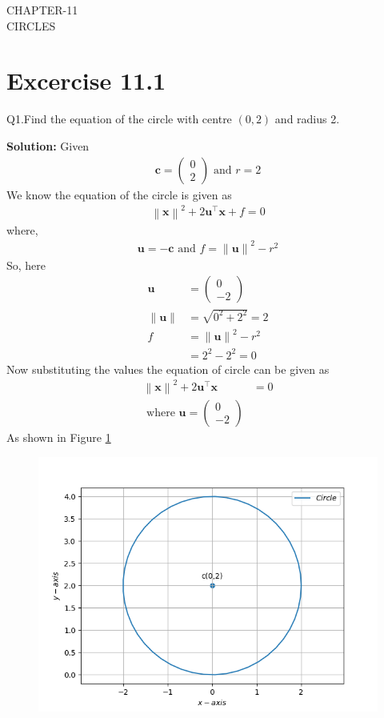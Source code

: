 \documentclass[12pt]{article}
\providecommand{\norm}[1]{\left\lVert#1\right\rVert}
\newcommand{\solution}{\noindent \textbf{Solution: }}
\newcommand{\myvec}[1]{\ensuremath{\begin{pmatrix}#1\end{pmatrix}}}
\let\vec\mathbf
\begin{document}
\begin{center}
\textbf\large{CHAPTER-11 \\ CIRCLES}

\end{center}
\section*{Excercise 11.1}

Q1.Find the equation of the circle with centre $(0,2)$ and radius 2.

\solution
Given
\begin{align}
	\vec{c} = \myvec{0\\2} \text{ and } r = 2
\end{align}
We know the equation of the circle is given as
\begin{align}
	\norm{\vec{x}}^{2} + 2\vec{u}^{\top}\vec{x} + f = 0
\end{align}
where,
\begin{align}
	\vec{u} = -\vec{c} \text{ and } f = \norm{\vec{u}}^{2} - r^{2}
\end{align}
So, here
\begin{align}
	\vec{u} &= \myvec{0\\-2}\\
	\norm{\vec{u}} &= \sqrt{0^2 + 2^2} = 2\\
	f &= \norm{\vec{u}}^2 - r^2\\
	  &= 2^2 - 2^2 = 0
\end{align}
Now substituting the values the equation of circle can be given as
\begin{align}
	\norm{\vec{x}}^2 + 2\vec{u}^\top\vec{x} &= 0\\
	\text{ where } \vec{u} = \myvec{0\\-2}        		       
\end{align}
As shown in Figure \ref{fig:Fig1}	
\begin{figure}[!h]
	\begin{center} 
	    \includegraphics[width=\columnwidth]{figs/circ1}
	\end{center}
\caption{}
\label{fig:Fig1}
\end{figure}
\end{document}

